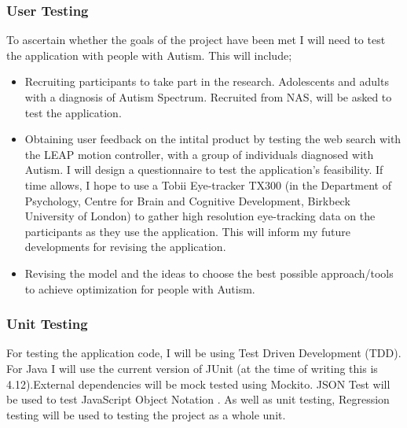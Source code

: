 \documentclass[10pt]{article}
\begin{document}
\subsubsection{User Testing}
To ascertain whether the goals of the project have been met I will need to test the application with people with Autism. This will include;
\begin{itemize}
\item Recruiting participants to take part in the research. Adolescents and adults with a diagnosis of Autism Spectrum. Recruited from NAS, will be asked to test the application.
\item Obtaining user feedback on the intital product by testing the web search with the LEAP motion controller, with a group of individuals diagnosed with Autism. I will design a questionnaire to test the application's feasibility. If time allows, I hope to use a Tobii Eye-tracker TX300 (in the Department of Psychology, Centre for Brain and Cognitive Development, Birkbeck University of London) to gather high resolution eye-tracking data on the participants as they use the application. This will inform my future developments for revising the application.
\item Revising the model and the ideas to choose the best possible approach/tools to achieve optimization for people with Autism.
\end{itemize}

\subsubsection{Unit Testing}
For testing the application code, I will be using Test Driven Development (TDD). For Java I will use the current version of JUnit (at the time of writing this is 4.12).External dependencies will be mock tested using Mockito. JSON Test will be used to test JavaScript Object Notation \cite{jsontest}. As well as unit testing, Regression testing will be used to testing the project as a whole unit.
\end{document}
